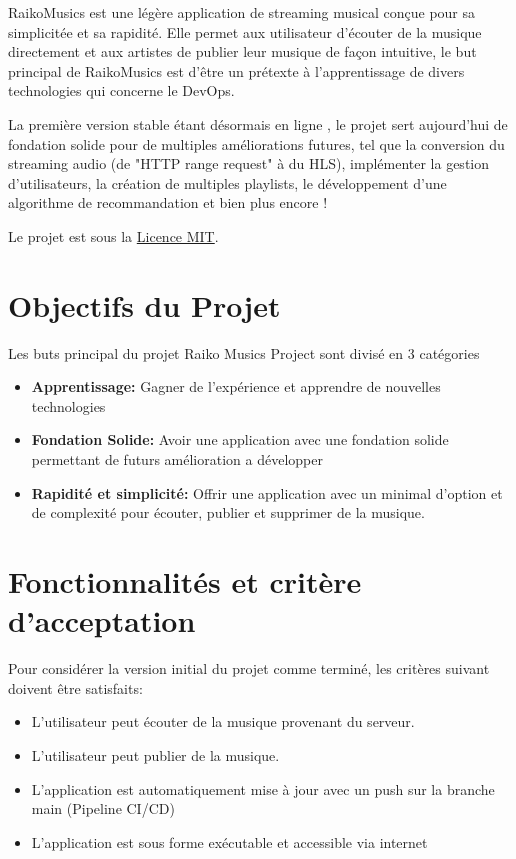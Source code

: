 \documentclass[12pt,a4paper]{article} %
\begin{document}
RaikoMusics est une légère application de streaming musical conçue pour sa simplicitée et sa rapidité. Elle permet aux utilisateur d'écouter de la musique directement et aux artistes de publier leur musique de façon intuitive, le but principal de RaikoMusics est d’être un prétexte à l'apprentissage de divers technologies qui concerne le DevOps.

La première version stable étant désormais en ligne , le projet sert aujourd’hui de fondation solide pour de multiples améliorations futures, tel que la conversion du streaming audio (de "HTTP range request" à du HLS), implémenter la gestion d'utilisateurs, la création de multiples playlists, le développement d'une algorithme de recommandation et bien plus encore !

Le projet est sous la \href{https://opensource.org/licenses/MIT}{Licence MIT}.

\section{Objectifs du Projet}

Les buts principal du projet Raiko Musics Project sont divisé en 3 catégories

\begin{itemize}
    \item \textbf{Apprentissage:} Gagner de l’expérience et apprendre de nouvelles technologies
    \item \textbf{Fondation Solide:} Avoir une application avec une fondation solide permettant de futurs amélioration a développer
    \item \textbf{Rapidité et simplicité:} Offrir une application avec un minimal d'option et de complexité pour écouter, publier et supprimer de la musique.

\end{itemize}

\section{Fonctionnalités et critère d'acceptation}

Pour considérer la version initial du projet comme terminé, les critères suivant doivent être satisfaits:

\begin{itemize}
    \item L'utilisateur peut écouter de la musique provenant du serveur.
    \item L'utilisateur peut publier de la musique.
    \item L'application est automatiquement mise à jour avec un push sur la branche main (Pipeline CI/CD)
    \item L'application est sous forme exécutable et accessible via internet
\end{itemize}
\end{document}
